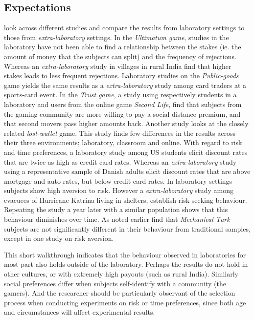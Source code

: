 \documentclass[preprint, 12pt]{elsarticle}
\begin{document}
\subsection{Expectations}

\cite{Charness_Gneezy_Kuhn_2013} look across different studies and compare the results from  laboratory settings to those from \emph{extra-laboratory} settings. In the \emph{Ultimatum game}, studies in the laboratory have not been able to find a relationship between the stakes (ie. the amount of money that the subjects can split) and the frequency of rejections. Whereas an \emph{extra-laboratory} study in villages in rural India find that higher stakes leads to less frequent rejections. Laboratory studies on the \emph{Public-goods} game yields the same results as a \emph{extra-laboratory} study among card traders at a sports-card event. In the \emph{Trust game}, a study using respectively students in a laboratory and users from the online game \emph{Second Life}, find that subjects from the gaming community are more willing to pay a social-distance premium, and that second movers pass higher amounts back. Another study looks at the closely related \emph{lost-wallet} game. This study finds few differences in the results across their three environments; laboratory, classroom and online. With regard to risk and time preferences, a laboratory study among US students elicit discount rates that are twice as high as credit card rates. Whereas an \emph{extra-laboratory} study using a representative sample of Danish adults elicit discount rates that are above mortgage and auto rates, but below credit card rates. In laboratory settings subjects show high aversion to risk. However a \emph{extra-laboratory} study among evacuees of Hurricane Katrina living in shelters, establish risk-seeking behaviour. Repeating the study a year later with a similar population shows that this behaviour diminishes over time. As noted earlier \cite{Goodman_Cryder_Cheema_2013} find that \emph{Mechanical Turk} subjects are not significantly different in their behaviour from traditional samples, except in one study on risk aversion.

This short walkthrough indicates that the behaviour observed in laboratories for most part also holds outside of the laboratory. Perhaps the results do not hold in other cultures, or with extremely high payouts (such as rural India). Similarly social preferences differ when subjects self-identify with a community (the gamers). And the researcher should be particularly observant of the selection process when conducting experiments on risk or time preferences, since both age and circumstances will affect experimental results.
\end{document}
